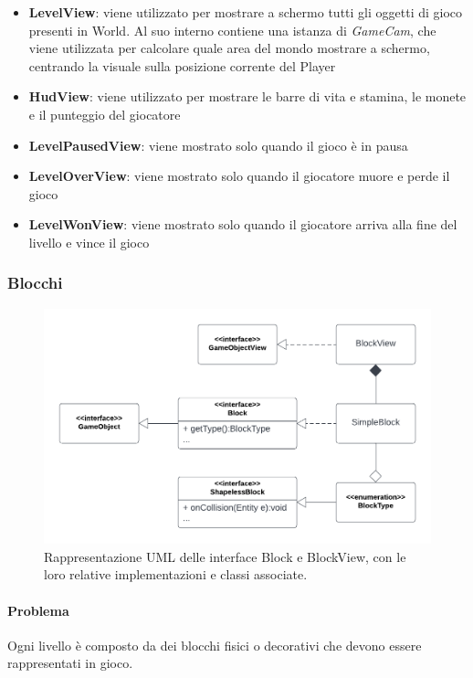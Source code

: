 \documentclass[a4paper,12pt]{report}
\begin{document}
\begin{itemize}
    \item \textbf{LevelView}: viene utilizzato per mostrare a schermo tutti gli oggetti di gioco presenti in World. Al suo interno contiene una istanza di \emph{GameCam}, che viene utilizzata per calcolare quale area del mondo mostrare a schermo, centrando la visuale sulla posizione corrente del Player
    \item \textbf{HudView}: viene utilizzato per mostrare le barre di vita e stamina, le monete e il punteggio del giocatore
    \item \textbf{LevelPausedView}: viene mostrato solo quando il gioco è in pausa
    \item \textbf{LevelOverView}: viene mostrato solo quando il giocatore muore e perde il gioco
    \item \textbf{LevelWonView}: viene mostrato solo quando il giocatore arriva alla fine del livello e vince il gioco
\end{itemize}

\subsubsection{Blocchi}

\begin{figure}[H]
\centering{}
\includegraphics[scale=0.8] {img/block.png}
\caption{Rappresentazione UML delle interface Block e BlockView, con le loro relative implementazioni e classi associate.}
\label{img:block}
\end{figure}

\paragraph{Problema} Ogni livello è composto da dei blocchi fisici o decorativi che devono essere rappresentati in gioco.
\end{document}
